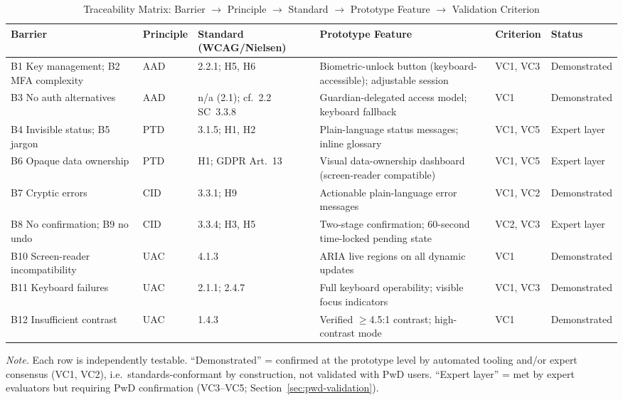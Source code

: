 \documentclass[journal,onecolumn]{IEEEtran}
\begin{document}
\begin{table}[htbp]
\centering
\small
\caption{Traceability Matrix: Barrier $\rightarrow$ Principle $\rightarrow$ Standard $\rightarrow$ Prototype Feature $\rightarrow$ Validation Criterion}
\label{tab:traceability}
\begin{adjustbox}{max width=\textwidth}
\begin{tabular}{|p{2.5cm}|p{1.0cm}|p{2.2cm}|p{3.6cm}|p{1.2cm}|p{1.6cm}|}
\hline
\textbf{Barrier} & \textbf{Principle} & \textbf{Standard (WCAG/Nielsen)} & \textbf{Prototype Feature} & \textbf{Criterion} & \textbf{Status} \\
\hline
B1 Key management; B2 MFA complexity & AAD & 2.2.1; H5, H6 & Biometric-unlock button (keyboard-accessible); adjustable session & VC1, VC3 & Demonstrated \\
\hline
B3 No auth alternatives & AAD & n/a (2.1); cf.\ 2.2 SC~3.3.8 & Guardian-delegated access model; keyboard fallback & VC1 & Demonstrated \\
\hline
B4 Invisible status; B5 jargon & PTD & 3.1.5; H1, H2 & Plain-language status messages; inline glossary & VC1, VC5 & Expert layer \\
\hline
B6 Opaque data ownership & PTD & H1; GDPR Art.~13 & Visual data-ownership dashboard (screen-reader compatible) & VC1, VC5 & Expert layer \\
\hline
B7 Cryptic errors & CID & 3.3.1; H9 & Actionable plain-language error messages & VC1, VC2 & Demonstrated \\
\hline
B8 No confirmation; B9 no undo & CID & 3.3.4; H3, H5 & Two-stage confirmation; 60-second time-locked pending state & VC2, VC3 & Expert layer \\
\hline
B10 Screen-reader incompatibility & UAC & 4.1.3 & ARIA live regions on all dynamic updates & VC1 & Demonstrated \\
\hline
B11 Keyboard failures & UAC & 2.1.1; 2.4.7 & Full keyboard operability; visible focus indicators & VC1, VC3 & Demonstrated \\
\hline
B12 Insufficient contrast & UAC & 1.4.3 & Verified $\geq$4.5:1 contrast; high-contrast mode & VC1 & Demonstrated \\
\hline
\end{tabular}
\end{adjustbox}
{\footnotesize\textit{Note.} Each row is independently testable. ``Demonstrated'' = confirmed at the prototype level by automated tooling and/or expert consensus (VC1, VC2), i.e.\ standards-conformant by construction, not validated with PwD users. ``Expert layer'' = met by expert evaluators but requiring PwD confirmation (VC3--VC5; Section~\ref{sec:pwd-validation}).}
\end{table}
\end{document}
